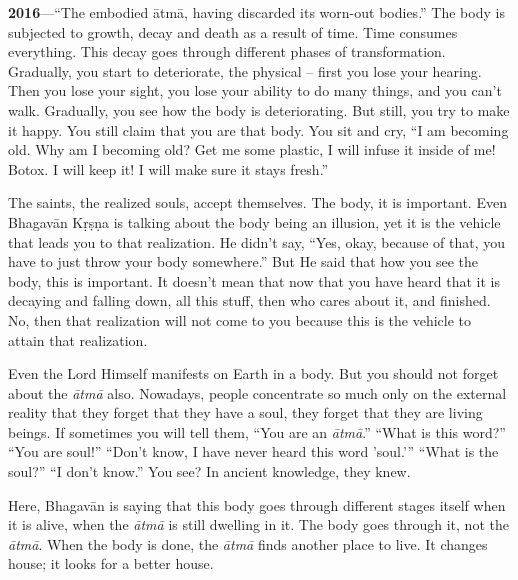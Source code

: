 \textbf{2016}---“The embodied ātmā, having discarded its worn-out bodies.” The body is subjected to growth, decay and death as a result of time. Time consumes everything. This decay goes through different phases of transformation. Gradually, you start to deteriorate, the physical -- first you lose your hearing. Then you lose your sight, you lose your ability to do many things, and you can’t walk. Gradually, you see how the body is deteriorating. But still, you try to make it happy. You still claim that you are that body. You sit and cry, “I am becoming old. Why am I becoming old? Get me some plastic, I will infuse it inside of me! Botox. I will keep it! I will make sure it stays fresh.”

The saints, the realized souls, accept themselves. The body, it is important. Even Bhagavān Kṛṣṇa is talking about the body being an illusion, yet it is the vehicle that leads you to that realization. He didn’t say, “Yes, okay, because of that, you have to just throw your body somewhere.” But He said that how you see the body, this is important. It doesn’t mean that now that you have heard that it is decaying and falling down, all this stuff, then who cares about it, and finished. No, then that realization will not come to you because this is the vehicle to attain that realization.

Even the Lord Himself manifests on Earth in a body. But you should not forget about the \textit{ātmā} also. Nowadays, people concentrate so much only on the external reality that they forget that they have a soul, they forget that they are living beings. If sometimes you will tell them, “You are an \textit{ātmā}.” “What is this word?” “You are soul!” “Don’t know, I have never heard this word 'soul.'” “What is the soul?” “I don’t know.” You see? In ancient knowledge, they knew.

Here, Bhagavān is saying that this body goes through different stages itself when it is alive, when the \textit{ātmā} is still dwelling in it. The body goes through it, not the \textit{ātmā}. When the body is done, the \textit{ātmā} finds another place to live. It changes house; it looks for a better house.

